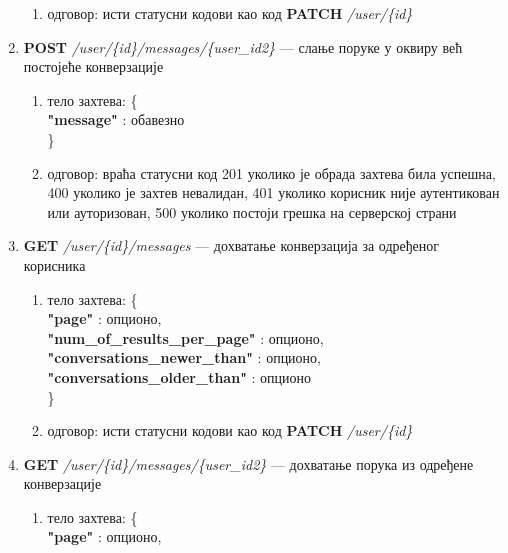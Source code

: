 \documentclass[12pt,oneside]{memoir}
\begin{document}
\begin{enumerate}
\begin{enumerate}
            \item одговор: исти статусни кодови као код \textbf{PATCH} \textit{/user/\{id\}}
        \end{enumerate}
    \item \textbf{POST} \textit{/user/\{id\}/messages/\{user\_id2\}} --- слање поруке у оквиру већ постојеће конверзације
        \begin{enumerate}
            \item тело захтева: \{\\
                    \hspace*{1cm} \textbf{"message"} : обавезно\\
                \}
            \item одговор: враћа статусни код 201 уколико је обрада захтева била успешна, 400 уколико је захтев невалидан, 401 уколико корисник није аутентикован или ауторизован, 500 уколико постоји грешка на серверској страни
        \end{enumerate}
    \item \textbf{GET} \textit{/user/\{id\}/messages} --- дохватање конверзација за одређеног корисника
        \begin{enumerate}
            \item тело захтева: \{\\
                    \hspace*{1cm} \textbf{"page"} : опционо,\\
                    \hspace*{1cm} \textbf{"num\_of\_results\_per\_page"} : опционо,\\
                    \hspace*{1cm} \textbf{"conversations\_newer\_than"} : опционо,\\
                    \hspace*{1cm} \textbf{"conversations\_older\_than"} : опционо\\
                \}
            \item одговор: исти статусни кодови као код \textbf{PATCH} \textit{/user/\{id\}}
        \end{enumerate}
    \item \textbf{GET} \textit{/user/\{id\}/messages/\{user\_id2\}} --- дохватање порука из одређене конверзације
        \begin{enumerate}
            \item тело захтева: \{\\
                    \hspace*{1cm} \textbf{"page"} : опционо,\\

\end{enumerate}
\end{enumerate}
\end{document}
